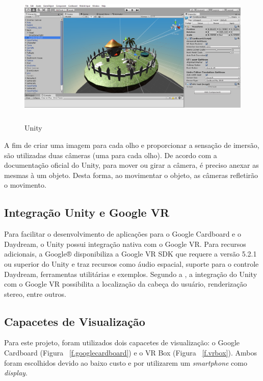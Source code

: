 \begin{figure}[H]
	\caption{\small Unity}
	\centering
	\includegraphics[height=6cm]{Imagens/unity.png}
	\label{f.unity}
\end{figure}

A fim de criar uma imagem para cada olho e proporcionar a sensação de imersão, são utilizadas duas câmeras (uma para cada olho). De acordo com a documentação oficial do Unity, para mover ou girar a câmera, é preciso anexar as mesmas à um objeto. Desta forma, ao movimentar o objeto, as câmeras refletirão o movimento. 

\subsection{Integração Unity e Google VR}
\label{ss.unitygoogle}

Para facilitar o desenvolvimento de aplicações para o Google Cardboard e o Daydream, o Unity possui integração nativa com o Google VR. Para recursos adicionais, a Google® disponibiliza a Google VR SDK que requere a versão 5.2.1 ou superior do Unity e traz recursos como áudio espacial, suporte para o controle Daydream, ferramentas utilitárias e exemplos.  Segundo a , a integração do Unity com o Google VR possibilita a localização da cabeça do usuário, renderização stereo, entre outros. 

\subsection{Capacetes de Visualização}
\label{ss.capacetes}

Para este projeto, foram utilizados dois capacetes de visualização: o Google Cardboard (Figura ~\ref{f.googlecardboard}) e o VR Box (Figura ~\ref{f.vrbox}). Ambos foram escolhidos devido ao baixo custo e por utilizarem um \textit{smartphone} como \textit{display}. 

